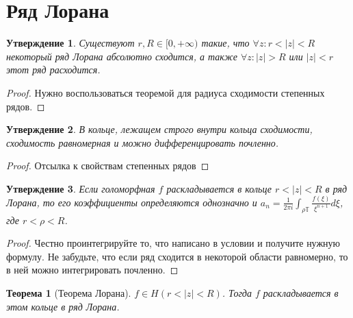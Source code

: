 \documentclass[12pt, letterpaper]{article}
\newtheorem{theorem}{Теорема}[section]
\newtheorem{prop}{Утверждение}[section]
\begin{document}
\section{Ряд Лорана}
\begin{prop} Существуют $r, R \in [0, +\infty)$ такие, что $\forall z: r < |z| < R$ некоторый ряд Лорана абсолютно сходится, а также $\forall z : |z|>R$ или $|z|<r$ этот ряд расходится.
\end{prop}
\begin{proof}
Нужно воспользоваться теоремой для радиуса сходимости степенных рядов. 
\end{proof}
\begin{prop}
В кольце, лежащем строго внутри кольца сходимости, сходимость равномерная и можно дифференцировать почленно.
\end{prop}
\begin{proof}
Отсылка к свойствам степенных рядов
\end{proof}
\begin{prop}
Если голоморфная $f$ раскладывается в кольце $r < |z| < R$ в ряд Лорана, то его коэффициенты определяются однозначно и $a_n = \frac1{2\pi i} \int_{\rho \mathbb{T}} \frac{f(\xi)}{\xi^{n+1}} d\xi$, где $r < \rho < R$. 
\end{prop}
\begin{proof}
Честно проинтегрируйте то, что написано в условии и получите нужную формулу. Не забудьте, что если ряд сходится в некоторой области равномерно, то в ней можно интегрировать почленно.
\end{proof}
\begin{theorem}[Теорема Лорана]
$f \in H(r < |z| < R)$. Тогда $f$ раскладывается в этом кольце в ряд Лорана.
\end{theorem}
\end{document}
